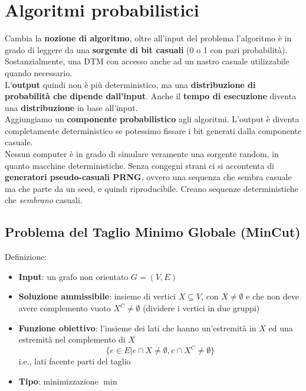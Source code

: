 
\section{Algoritmi probabilistici}

Cambia la \textbf{nozione di algoritmo}, oltre all'input del problema l'algoritmo è in grado di leggere da una \textbf{sorgente di bit casuali} (0 o 1 con pari probabilità). Sostanzialmente, una DTM con accesso anche ad un nastro casuale utilizzabile quando necessario.\\

L'\textbf{output} quindi non è più deterministico, ma una \textbf{distribuzione di probabilità che dipende dall'input}. Anche il \textbf{tempo di esecuzione} diventa una \textbf{distribuzione} in base all'input.\\

Aggiungiamo un \textbf{componente probabilistico} agli algoritmi. L'output è diventa completamente deterministico se potessimo fissare i bit generati dalla componente casuale.\\

Nessun computer è in grado di simulare veramente una sorgente random, in quanto macchine deterministiche. Senza congegni strani ci si accontenta di \textbf{generatori pseudo-casuali PRNG}, ovvero una sequenza che sembra casuale ma che parte da un seed, e quindi riproducibile. Creano sequenze deterministiche che \textit{sembrano} casuali.\\

\newpage

\subsection{Problema del Taglio Minimo Globale (MinCut)}

Definizione:
\begin{itemize}
	\item \textbf{Input}: un grafo non orientato $G = (V,E)$
	\item \textbf{Soluzione ammissibile}: insieme di vertici $X \subseteq V$, con $X \neq \emptyset$ e che non deve avere complemento vuoto $X^C \neq \emptyset$ (dividere i vertici in due gruppi)
	\item \textbf{Funzione obiettivo}: l'insieme dei lati che hanno un'estremità in $X$ ed una estremità nel complemento di $X$
	$$ \{e \in E | e \cap X \neq \emptyset, e \cap X^C \neq \emptyset \} $$
	i.e., lati facente parti del taglio
	\item \textbf{Tipo}: minimizzazione $\min$
\end{itemize}

